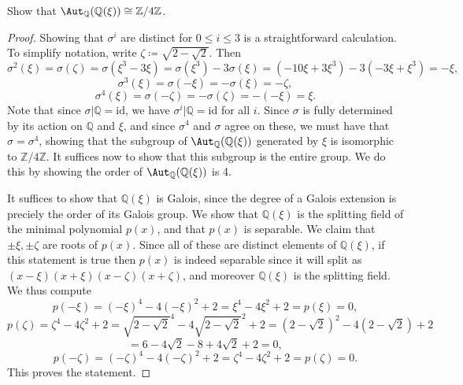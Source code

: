 \documentclass[11pt, letterpaper]{article}
\begin{document}
\begin{problem}
	Show that $\Aut_{\mathbb{Q} }(\mathbb{Q} (\xi )) \cong \mathbb{Z} /4\mathbb{Z} $.
\end{problem}
\begin{proof}
	Showing that $\sigma ^i$ are distinct for $0\leq i\leq 3$ is a straightforward calculation. To simplify notation, write $\zeta \coloneqq \sqrt{2-\sqrt{2} } $. Then
	\[
		\sigma ^2(\xi )=\sigma (\zeta )=\sigma (\xi ^3-3\xi )=\sigma (\xi ^3)-3\sigma (\xi )=\left( -10\xi +3\xi ^3 \right) -3\left( -3\xi +\xi ^3 \right)=-\xi ,
	\]
	\[
		\sigma ^3(\xi )=\sigma (-\xi )=-\sigma (\xi )=-\zeta ,
	\]
	\[
		\sigma ^4(\xi )=\sigma (-\zeta )=-\sigma (\zeta )=-(-\xi )=\xi 
	.\]
	Note that since $\sigma |\mathbb{Q} =\mathrm{id} $, we have $\sigma ^i|\mathbb{Q}=\mathrm{id} $ for all $i$. Since $\sigma$ is fully determined by its action on $\mathbb{Q} $ and $\xi $, and since $\sigma ^4$ and $\sigma $ agree on these, we must have that $\sigma =\sigma ^4$, showing that the subgroup of $\Aut_{\mathbb{Q} }(\mathbb{Q} (\xi )) $ generated by $\xi $ is isomorphic to $\mathbb{Z} /4\mathbb{Z} $. It suffices now to show that this subgroup is the entire group. We do this by showing the order of $\Aut_{\mathbb{Q} }(\mathbb{Q} (\xi )) $ is 4.

	It suffices to show that $\mathbb{Q} (\xi )$ is Galois, since the degree of a Galois extension is preciely the order of its Galois group. We show that $\mathbb{Q} (\xi )$ is the splitting field of the minimal polynomial $p(x)$, and that $p(x)$ is separable. We claim that $\pm \xi ,\pm\zeta $ are roots of $p(x)$. Since all of these are distinct elements of $\mathbb{Q} (\xi )$, if this statement is true then $p(x)$ is indeed separable since it will split as $(x-\xi )(x+\xi )(x-\zeta )(x+\zeta )$, and moreover $\mathbb{Q} (\xi )$ is the splitting field. We thus compute
	\[
		p(-\xi )=(-\xi )^4-4(-\xi )^2+2=\xi ^4-4\xi ^2+2=p(\xi )=0,
	\]
	\[
		p(\zeta )=\zeta ^4-4\zeta ^2+2=\sqrt{2-\sqrt{2} } ^4 - 4\sqrt{2-\sqrt{2} } ^2+2=\left( 2-\sqrt{2}  \right) ^2-4\left( 2-\sqrt{2}  \right) +2
	\]
	\[
		=6-4\sqrt{2} -8+4\sqrt{2} +2=0,
	\]
	\[
		p(-\zeta )=\left( -\zeta  \right) ^4-4(-\zeta )^2+2=\zeta ^4-4\zeta ^2+2=p(\zeta )=0
	.\]
	This proves the statement.
\end{proof}
\end{document}
